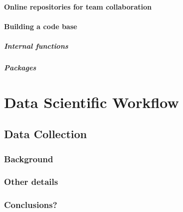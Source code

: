 \documentclass[
]{book}
\begin{document}
\hypertarget{online-repositories-for-team-collaboration-1}{%
\subsection{Online repositories for team collaboration}\label{online-repositories-for-team-collaboration-1}}

\hypertarget{building-a-code-base-1}{%
\subsection{Building a code base}\label{building-a-code-base-1}}

\hypertarget{internal-functions-1}{%
\subsubsection{Internal functions}\label{internal-functions-1}}

\hypertarget{packages-1}{%
\subsubsection{Packages}\label{packages-1}}

\hypertarget{part-data-scientific-workflow}{%
\part*{Data Scientific Workflow}\label{part-data-scientific-workflow}}

\hypertarget{data-collection}{%
\chapter{Data Collection}\label{data-collection}}

\hypertarget{background}{%
\section{Background}\label{background}}

\hypertarget{other-details}{%
\section{Other details}\label{other-details}}

\hypertarget{conclusions}{%
\section{Conclusions?}\label{conclusions}}
\end{document}
